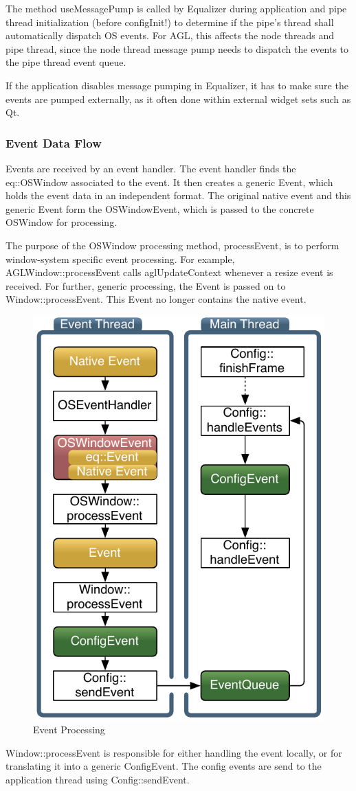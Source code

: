 \documentclass[10pt,a4]{scrartcl}
\begin{document}
The method \textsf{useMessagePump} is called by Equalizer during
application and pipe thread initialization (before configInit!) to
determine if the pipe's thread shall automatically dispatch OS
events. For AGL, this affects the node threads and pipe thread, since
the node thread message pump needs to dispatch the events to the pipe
thread event queue.

If the application disables message pumping in Equalizer, it has to make
sure the events are pumped externally, as it often done within external
widget sets such as Qt.

\subsubsection{Event Data Flow}

Events are received by an event handler. The event handler finds the
\textsf{eq::OSWindow} associated to the event. It then creates a generic
\textsf{Event}, which holds the event data in an independent
format. The original native event and this generic \textsf{Event}
form the \textsf{OSWindowEvent}, which is passed to the concrete
\textsf{OSWindow} for processing.

The purpose of the \textsf{OSWindow} processing method,
\textsf{processEvent}, is to perform window-system specific event
processing. For example, \textsf{AGLWindow::processEvent} calls
\textsf{aglUpdateContext} whenever a resize event is received. For
further, generic processing, the \textsf{Event} is passed on to
\textsf{Window::processEvent}. This \textsf{Event} no longer contains
the native event.

\begin{figure}
  \includegraphics[width=.382\textwidth]{images/eventFilter.pdf}
  {\caption{\label{fEventProcessing}Event Processing}}
\end{figure}
\textsf{Window::processEvent} is responsible for either handling
the event locally, or for translating it into a generic
\textsf{ConfigEvent}. The config events are send to the application
thread using \textsf{Config::sendEvent}. 
\end{document}
